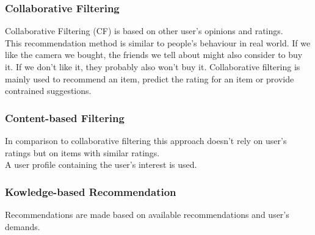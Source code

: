 \documentclass[runningheads,a4paper]{llncs}
\begin{document}
\subsubsection{Collaborative Filtering}
Collaborative Filtering (CF) is based on other user's opinions and ratings. \\
This recommendation method is similar to people's behaviour in real world. If we like the camera we bought, 
the friends we tell about might also consider to buy it. If we don't like it, they probably also won't buy it.
Collaborative filtering is mainly used to recommend an item, 
predict the rating for an item or provide contrained suggestions. \cite{schafer2007collaborative}
\subsubsection{Content-based Filtering}
In comparison to collaborative filtering this approach doesn't rely on user's ratings but 
on items with similar ratings. \\A user profile containing the user's interest is used. \cite{burke2002hybrid}
\subsubsection{Kowledge-based Recommendation}
Recommendations are made based on available recommendations and user's demands. \cite{burke2002hybrid}
\end{document}

